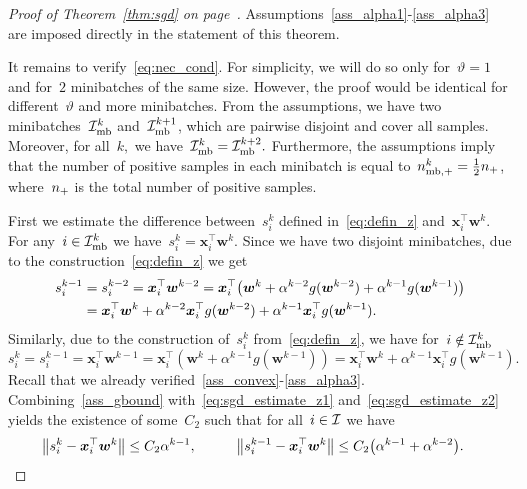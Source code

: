\begin{proof}[Proof of Theorem~\ref{thm:sgd} on page~\pageref{thm:sgd}]
  Assumptions~\ref{ass_alpha1}-\ref{ass_alpha3} are imposed directly in the statement of this theorem. 

  It remains to verify~\eqref{eq:nec_cond}. For simplicity, we will do so only for~$\vartheta = 1$ and for~$2$ minibatches of the same size. However, the proof would be identical for different~$\vartheta$ and more minibatches. From the assumptions, we have two minibatches~$\mathcal{I}_{\text{mb}}^k$ and~$\mathcal{I}_{\text{mb}}^{k+1}$, which are pairwise disjoint and cover all samples. Moreover, for all~$k,$ we have~$\mathcal{I}_{\text{mb}}^k = \mathcal{I}_{\text{mb}}^{k+2}.$ Furthermore, the assumptions imply that the number of positive samples in each minibatch is equal to~$n_{\text{mb},+}^k = \frac{1}{2} n_{+}$, where~$n_{+}$ is the total number of positive samples.
   
   First we estimate the difference between~$s_i^k$ defined in~\eqref{eq:defin_z} and~$\bm{x}_i^\top \bm{w}^k$. For any~$i \in \mathcal{I}_{\text{mb}}^k$ we have~$s_i^k = \bm{x}_i^\top \bm{w}^k.$ Since we have two disjoint minibatches, due to the construction~\eqref{eq:defin_z} we get
  \begin{equation}\label{eq:sgd_estimate_z1}
    \begin{aligned}
      s_i^{k-1}
        & = s_i^{k-2}
          = \bm{x}_i^\top \bm{w}^{k-2}
          = \bm{x}_i^\top \Brac{\bm{w}^k + \alpha^{k-2}g(\bm{w}^{k-2}) + \alpha^{k-1} g(\bm{w}^{k-1})} \\
        & = \bm{x}_i^\top \bm{w}^k + \alpha^{k-2}\bm{x}_i^\top g(\bm{w}^{k-2}) + \alpha^{k-1}\bm{x}_i^\top g(\bm{w}^{k-1}).
    \end{aligned}
  \end{equation}
  Similarly, due to the construction of~$s_i^k$ from~\eqref{eq:defin_z}, we have for~$i \notin \mathcal{I}_{\text{mb}}^k$
  \begin{equation}\label{eq:sgd_estimate_z2}
    s_i^k
    = s_i^{k-1}
    = \bm{x}_i^\top \bm{w}^{k-1}
    = \bm{x}_i^\top (\bm{w}^k+\alpha^{k-1}g(\bm{w}^{k-1}))
    = \bm{x}_i^\top \bm{w}^k + \alpha^{k-1}\bm{x}_i^\top g(\bm{w}^{k-1}).
  \end{equation}
  Recall that we already verified~\ref{ass_convex}-\ref{ass_alpha3}. Combining~\ref{ass_gbound} with~\eqref{eq:sgd_estimate_z1} and~\eqref{eq:sgd_estimate_z2} yields the existence of some~$C_2$ such that for all~$i \in \mathcal{I}$ we have
  \begin{equation}\label{eq:estimate_diff_z}
    \begin{aligned}
      \norm{s_i^k - \bm{x}_i^\top \bm{w}^k} &\leq C_2\alpha^{k-1}, \quad & \quad 
      \norm{s_i^{k-1} - \bm{x}_i^\top \bm{w}^k} &\leq C_2\Brac{\alpha^{k-1}+\alpha^{k-2}}.

\end{aligned}
\end{equation}
\end{proof}
